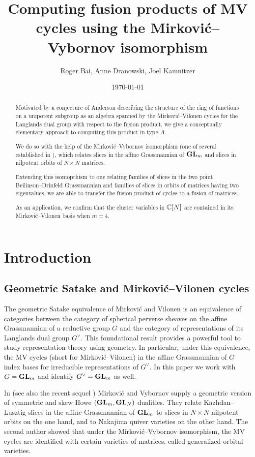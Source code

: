 \documentclass{article}
\title{Computing fusion products of MV cycles using the Mirkovi\'c--Vybornov isomorphism}
\author{Roger Bai, Anne Dranowski, Joel Kamnitzer}
\date{\today}
\begin{document}
\maketitle
\begin{abstract}
    Motivated by a conjecture of Anderson describing the structure of the ring of functions on a unipotent subgroup as an algebra spanned by the Mirkovi\'c--Vilonen cycles for the Langlands dual group with respect to the fusion product, we give a conceptually elementary approach to computing this product in type $A$. 
    
    We do so with the help of the Mirkovi\'c--Vybornov isomorphism (one of several established in \cite{mirkovic2007quiver}), which relates slices in the affine Grassmannian of ${\mathbf{GL}}_m$ and slices in nilpotent orbits of $N\times N$ matrices.
   
    Extending this isomoprhism to one relating families of slices in the two point Beilinson--Drinfeld Grassmannian and families of slices in orbits of matrices having two eigenvalues, we are able to transfer the fusion product of cycles to a fusion of matrices.
    
    As an application, we confirm that the cluster variables in $\mathbb C[N]$ are contained in its Mirkovi\'c--Vilonen basis when $m=4$. 
\end{abstract}

\section{Introduction}
\label{s:intro}
% 
\subsection{Geometric Satake and Mirkovi\'c--Vilonen cycles}
\label{ss:gsmv}
% 
The geometric Satake equivalence of Mirkovi\'c and Vilonen \cite{mirkovic2007geometric} is an equivalence of categories between the category of spherical perverse sheaves on the affine Grassmannian of a reductive group $ G $ and the category of representations of its Langlands dual group $G^\vee$.  This foundational result provides a powerful tool to study representation theory using geometry.  In particular, under this equivalence, the MV cycles (short for Mirkovi\'c--Vilonen) in the affine Grassmannian of $ G $ index bases for irreducible representations of $ G^\vee $. In this paper we work with $ G = {\mathbf{GL}}_m$ and identify $ G^\vee = {\mathbf{GL}}_m$ as well.

In \cite{mirkovic2007quiver} (see also the recent sequel \cite{mirkovic2019comparison}) Mirkovi\'c and Vybornov supply a geometric version of symmetric and skew Howe $({\mathbf{GL}}_m,{\mathbf{GL}}_N)$ dualities.  They relate Kazhdan--Lusztig slices in the affine Grassmannian of ${\mathbf{GL}}_m$ to slices in $N\times N$ nilpotent orbits on the one hand, and to Nakajima quiver varieties on the other hand.    The second author \cite{dthesis} showed  that under the Mirkovi\'c--Vybornov isomorphism, the MV cycles are identified with certain varieties of matrices, called generalized orbital varieties.
\end{document}
